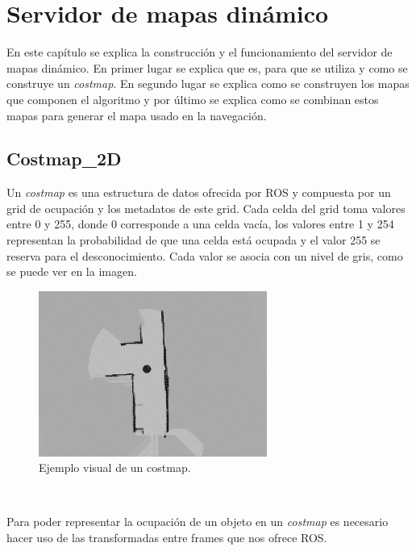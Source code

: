 \chapter{Servidor de mapas dinámico}
\label{cap:sevidordemapasdinamico}


En este capítulo se explica la construcción y el funcionamiento del servidor de mapas dinámico. En primer lugar se explica que es, para que se utiliza y como se construye un \textit{costmap}. En segundo lugar se explica como se construyen los mapas que componen el algoritmo y por último se explica como se combinan estos mapas para generar el mapa usado en la navegación.

\section{Costmap\_2D}
\label{sec:costmap2d}
Un \textit{costmap} es una estructura de datos ofrecida por ROS y compuesta por un grid de ocupación y los metadatos de este grid. Cada celda del grid toma valores entre 0 y 255, donde 0 corresponde a una celda vacía, los valores entre 1 y 254 representan la probabilidad de que una celda está ocupada y el valor 255 se reserva para el desconocimiento. Cada valor se asocia con un nivel de gris, como se puede ver en la imagen.
\begin{figure} [hbtp]
  \begin{center}
    \includegraphics[width=7.5cm]{img/cap4/costmap-ejemplo}
  \end{center}
  \caption{Ejemplo visual de un costmap.}
  \label{fig:costmap-ejemplo}
\end{figure}\

Para poder representar la ocupación de un objeto en un \textit{costmap} es necesario hacer uso de las transformadas entre frames que nos ofrece ROS.

